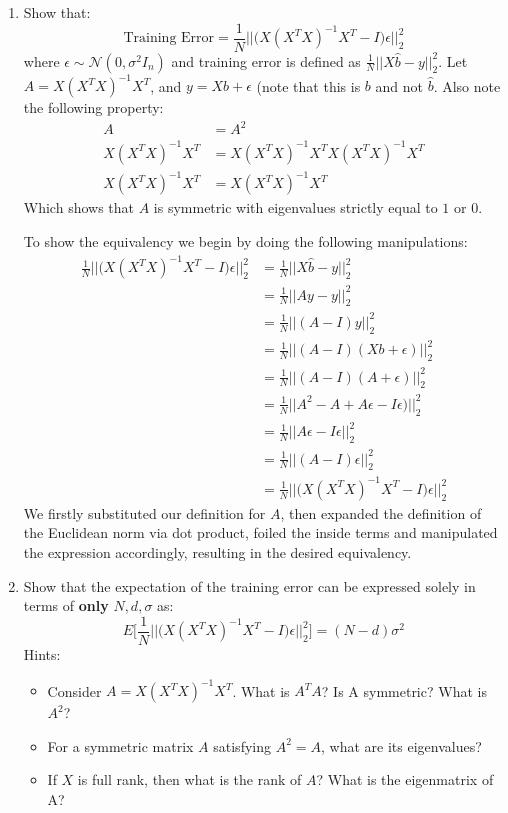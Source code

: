 \documentclass{article}
\begin{document}
\begin{enumerate}
  
  \item Show that: 
    $$
    \textrm{Training Error} = \frac{1}{N} \Big|\Big| \Big( X(X^TX)^{-1}X^T - I \Big) \epsilon \Big| \Big|^2_2
    $$
    where $\epsilon \sim \mathcal{N}(0, \sigma^2 I_n)$ and training error is defined as $\frac{1}{N}||X\hat{b} - y||_2^2$. 
\subitem
Let $A = X(X^TX)^{-1}X^T$, and $y=Xb+\epsilon$ (note that this is $b$ and not $\hat{b}$. Also note the following property:
\begin{equation}
    \begin{split}
        A &= A^2 \\
        X(X^TX)^{-1}X^T &= X(X^TX)^{-1}X^T X(X^TX)^{-1}X^T \\
        X(X^TX)^{-1}X^T &= X(X^TX)^{-1}X^T
    \end{split}
\end{equation}
 Which shows that $A$ is symmetric with eigenvalues strictly equal to $1$ or $0$.
 
 To show the equivalency we begin by doing the following manipulations:
\begin{equation}
\begin{split}
    \frac{1}{N} \Big|\Big| \Big( X(X^TX)^{-1}X^T - I \Big) \epsilon \Big| \Big|^2_2 &= \frac{1}{N}||X\hat{b} - y||_2^2 \\
    &= \frac{1}{N}||Ay - y||_2^2 \\
    &= \frac{1}{N}||(A- I)y||_2^2 \\
    &= \frac{1}{N}||(A-I)(Xb+\epsilon)||_2^2 \\
    &= \frac{1}{N}||(A-I)(A + \epsilon)||_2^2 \\
    &= \frac{1}{N}|| A^2 - A + A\epsilon - I\epsilon)||_2^2 \\
    &= \frac{1}{N}||A\epsilon - I\epsilon||_2^2 \\
    &= \frac{1}{N}||(A-I)\epsilon||_2^2 \\
    &= \frac{1}{N} \Big|\Big| \Big( X(X^TX)^{-1}X^T - I \Big) \epsilon \Big| \Big|^2_2
\end{split}
\end{equation}
We firstly substituted our definition for $A$, then expanded the definition of the Euclidean norm via dot product, foiled the inside terms and manipulated the expression accordingly, resulting in the desired equivalency.
  \item Show that the expectation of the training error can be expressed solely in terms of \textbf{only} $N, d, \sigma$ as:
  $$
  E \Big[ \frac{1}{N} \Big|\Big| \Big( X(X^TX)^{-1}X^T - I \Big) \epsilon \Big| \Big|^2_2 \Big] = (N-d)\sigma^2
  $$ 
  Hints:
  \begin{itemize}
    \item Consider $A = X(X^TX)^{-1}X^T$. What is $A^TA$? Is A symmetric? What is $A^2$?
    \item For a symmetric matrix $A$ satisfying $A^2 = A$, what are its eigenvalues? 
    \item If $X$ is full rank, then what is the rank of $A$? What is the eigenmatrix of A?
  \end{itemize}
  

\end{enumerate}
\end{document}
